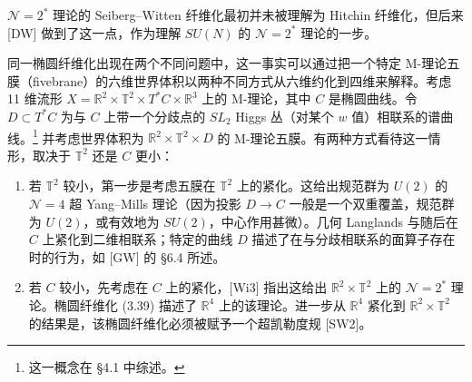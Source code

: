 
$\mathcal{N}=2^*$ 理论的 Seiberg--Witten 纤维化最初并未被理解为 Hitchin 纤维化，但后来 [DW] 做到了这一点，作为理解 $SU(N)$ 的 $\mathcal{N}=2^*$ 理论的一步。

同一椭圆纤维化出现在两个不同问题中，这一事实可以通过把一个特定 M-理论五膜（fivebrane）的六维世界体积以两种不同方式从六维约化到四维来解释。考虑 11 维流形 $X=\mathbb{R}^2\times\mathbb{T}^2\times T^*C\times\mathbb{R}^3$ 上的 M-理论，其中 $C$ 是椭圆曲线。令 $D\subset T^*C$ 为与 $C$ 上带一个分歧点的 $SL_2$ Higgs 丛（对某个 $w$ 值）相联系的谱曲线。\footnote{这一概念在 §4.1 中综述。} 并考虑世界体积为 $\mathbb{R}^2\times\mathbb{T}^2\times D$ 的 M-理论五膜。有两种方式看待这一情形，取决于 $\mathbb{T}^2$ 还是 $C$ 更小：
\begin{enumerate}[label=(\arabic*),leftmargin=2.2em,itemsep=2pt,topsep=2pt]
\item 若 $\mathbb{T}^2$ 较小，第一步是考虑五膜在 $\mathbb{T}^2$ 上的紧化。这给出规范群为 $U(2)$ 的 $\mathcal{N}=4$ 超 Yang--Mills 理论（因为投影 $D\to C$ 一般是一个双重覆盖，规范群为 $U(2)$，或有效地为 $SU(2)$，中心作用甚微）。几何 Langlands 与随后在 $C$ 上紧化到二维相联系；特定的曲线 $D$ 描述了在与分歧相联系的面算子存在时的行为，如 [GW] 的 §6.4 所述。
\item 若 $C$ 较小，先考虑在 $C$ 上的紧化，[Wi3] 指出这给出 $\mathbb{R}^2\times\mathbb{T}^2$ 上的 $\mathcal{N}=2^*$ 理论。椭圆纤维化 (3.39) 描述了 $\mathbb{R}^4$ 上的该理论。进一步从 $\mathbb{R}^4$ 紧化到 $\mathbb{R}^2\times\mathbb{T}^2$ 的结果是，该椭圆纤维化必须被赋予一个超凯勒度规 [SW2]。
\end{enumerate}
